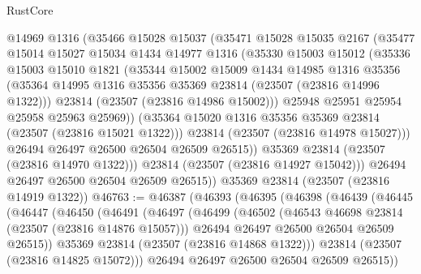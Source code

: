 \begin{lexlean}{RustCore}
\begin{coremodule}
            @14969
            @1316
            (@35466
              @15028
              @15037
              (@35471
                @15028
                @15035
                @2167
                (@35477
                  @15014
                  @15027
                  @15034
                  @1434
                  @14977
                  @1316
                  (@35330
                    @15003
                    @15012
                    (@35336
                      @15003
                      @15010
                      @1821
                      (@35344
                        @15002
                        @15009
                        @1434
                        @14985
                        @1316
                        @35356
                        (@35364 @14995 @1316 @35356 @35369 @23814 (@23507 (@23816 @14996 @1322)))
                        @23814
                        (@23507 (@23816 @14986 @15002)))
                      @25948
                      @25951
                      @25954
                      @25958
                      @25963
                      @25969))
                  (@35364 @15020 @1316 @35356 @35369 @23814 (@23507 (@23816 @15021 @1322)))
                  @23814
                  (@23507 (@23816 @14978 @15027)))
                @26494
                @26497
                @26500
                @26504
                @26509
                @26515))
            @35369
            @23814
            (@23507 (@23816 @14970 @1322)))
          @23814
          (@23507 (@23816 @14927 @15042)))
        @26494
        @26497
        @26500
        @26504
        @26509
        @26515))
    @35369
    @23814
    (@23507 (@23816 @14919 @1322))
@46763 := @46387
    (@46393
      (@46395
        (@46398
          (@46439
            (@46445
              (@46447
                (@46450
                  (@46491
                    (@46497
                      (@46499
                        (@46502
                          (@46543 @46698 @23814 (@23507 (@23816 @14876 @15057)))
                          @26494
                          @26497
                          @26500
                          @26504
                          @26509
                          @26515))
                      @35369
                      @23814
                      (@23507 (@23816 @14868 @1322)))
                    @23814
                    (@23507 (@23816 @14825 @15072)))
                  @26494
                  @26497
                  @26500
                  @26504
                  @26509
                  @26515))

\end{coremodule}
\end{lexlean}
